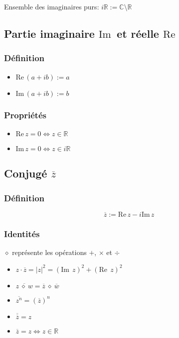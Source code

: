 \documentclass{article}
\newcommand{\im}{\text{Im}\,}
\newcommand{\re}{\text{Re}\,}
\newcommand{\R}{\mathds{R}}
\renewcommand{\C}{\mathds{C}}
\newcommand{\conj}[1]{\overline{#1}}
\newcommand{\placeholder}{\diamond}
\begin{document}
Ensemble des imaginaires purs: $i\R := \C \setminus \R$

\subsection{Partie imaginaire $\im$ et réelle $\re$}
\subsubsection{Définition}
\begin{itemize}
    \item $\re(a + ib) := a$
    \item $\im(a + ib) := b$
\end{itemize}
\subsubsection{Propriétés}
\begin{itemize}
    \item $\re z = 0 \iff z \in \R$
    \item $\im z = 0 \iff z \in i\R$
\end{itemize}

\subsection{Conjugé $\conj{z}$}

\subsubsection{Définition}
\[\conj{z} := \re z - i\im z\]



\subsubsection{Identités}

$\placeholder$ représente les opérations $+$, $\times$ et $\div$

\begin{itemize}
    \item $z\cdot\conj{z} = |z|^2 = (\im\; z)^2 + (\re\; z)^2$
    \item $\conj{z \:\placeholder\: w} = \conj{z} \:\placeholder\: \conj{w}$
    \item $\conj{z^n} = (\conj{z})^n$
    \item $\conj{\conj{z}} = z $
    \item $\conj{z} = z \iff z \in \R$
\end{itemize}
\end{document}
